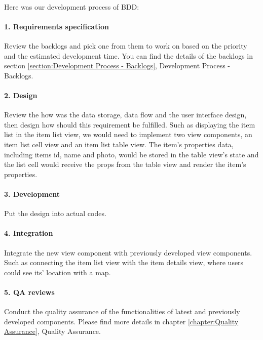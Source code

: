 \documentclass[12pt,a4paper]{article}
\begin{document}
          \paragraph{}Here was our development process of BDD:
          
          \paragraph{1. Requirements specification}Review the backlogs and pick one from them to work on based on the priority and the estimated development time. You can find the details of the backlogs in section \ref{section:Development Process - Backlogs}, Development Process - Backlogs.
          
          \paragraph{2. Design}Review the how was the data storage, data flow and the user interface design, then design how should this requirement be fulfilled. Such as displaying the item list in the item list view, we would need to implement two view components, an item list cell view and an item list table view. The item's properties data, including items id, name and photo, would be stored in the table view's state and the list cell would receive the props from the table view and render the item's properties.
          
          \paragraph{3. Development}Put the design into actual codes.
          
          \paragraph{4. Integration}Integrate the new view component with previously developed view components. Such as connecting the item list view with the item details view, where users could see its' location with a map.
          
          \paragraph{5. QA reviews}Conduct the quality assurance of the functionalities of latest and previously developed components. Please find more details in chapter \ref{chapter:Quality Assurance}, Quality Assurance.
          
\end{document}
